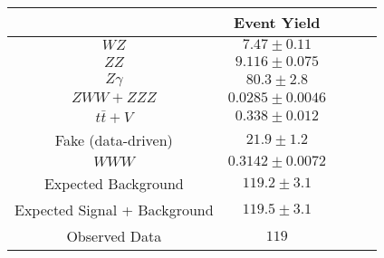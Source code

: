 \begin{tabular}{|c||c|c|c|c|}
\hline
 & Event Yield\\ 
\hline\hline
$WZ$ &  $7.47 \pm 0.11$\\ 
$ZZ$ &  $9.116 \pm 0.075$\\ 
$Z\gamma$ &  $80.3 \pm 2.8$\\ 
$ZWW+ZZZ$ &  $0.0285 \pm 0.0046$\\ 
$t\bar{t}+V$ &  $0.338 \pm 0.012$\\ 
Fake (data-driven) &  $21.9 \pm 1.2$\\ 
$WWW$ &  $0.3142 \pm 0.0072$\\ 
\hline
Expected Background &  $119.2 \pm 3.1$\\ 
Expected Signal + Background &  $119.5 \pm 3.1$\\ 
\hline
Observed Data &  $119$\\ 
\hline
\end{tabular}
